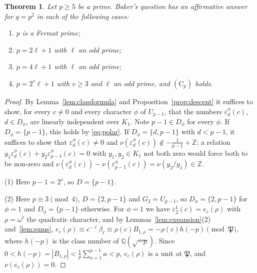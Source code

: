\documentclass[11pt]{amsart}
\newtheorem{theorem}{Theorem}[section]
\theoremstyle{definition}
\theoremstyle{remark}
\providecommand{\Q}{\mathbb Q}
\providecommand{\Z}{\mathbb Z}
\newcommand{\fP}{\mathfrak P}
\numberwithin{equation}{section}
\begin{document}
\begin{theorem}\label{thm:psquare}
Let $p\ge5$ be a prime.
Baker's question has an affirmative answer for $q=p^2$ in each of the following cases:
\begin{enumerate}
\item $p$ is a Fermat prime;
\item $p=2\ell+1$ with $\ell$ an odd prime;
\item $p=4\ell+1$ with $\ell$ an odd prime;
\item $p=2^v\ell+1$ with $v\ge3$ and $\ell$ an odd prime, and $(\mathrm C_p)$ holds.
\end{enumerate}
\end{theorem}

\begin{proof}
By Lemma~\ref{lem:classformula} and Proposition~\ref{prop:descent} it suffices to show, for every $c\ne0$ and every character $\phi$ of $U_{p-1}$, that the numbers $\varepsilon_d^\phi(c)$, $d\in D_\phi$, are linearly independent over $K_1$.
Note $p-1\in D_\phi$ for every $\phi$.
If $D_\phi=\{p-1\}$, this holds by \eqref{eq:polar}.
If $D_\phi=\{d,p-1\}$ with $d<p-1$, it suffices to show that $\varepsilon_d^\phi(c)\ne0$ and $\nu(\varepsilon_d^\phi(c))\notin-\frac1{p-1}+\Z$: a relation $y_1\varepsilon_d^\phi(c)+y_2\varepsilon_{p-1}^\phi(c)=0$ with $y_1,y_2\in K_1$ not both zero would force both to be non-zero and $\nu(\varepsilon^\phi_d(c))-\nu(\varepsilon^\phi_{p-1}(c))=\nu(y_2/y_1)\in\Z$.

(1) Here $p-1=2^v$, so $D=\{p-1\}$.

(2) Here $p\equiv3\pmod 4$, $D=\{2,p-1\}$ and $G_2=U_{p-1}$, so $D_\phi=\{2,p-1\}$ for $\phi=1$ and $D_\phi=\{p-1\}$ otherwise.
For $\phi=1$ we have $\varepsilon_2^1(c)=e_c(\rho)$ with $\rho=\omega^{\ell}$ the quadratic character, and by Lemmas~\ref{lem:expansion}(2) and~\ref{lem:sums}, $e_c(\rho)\equiv c^{-\ell}\beta_\ell\equiv\rho(c)B_{1,\rho}=-\rho(c)h(-p)\pmod\fP$, where $h(-p)$ is the class number of $\Q(\sqrt{-p})$.
Since $0<h(-p)=|B_{1,\rho}|<\frac1p\sum_{a=1}^{p-1}a<p$, $e_c(\rho)$ is a unit at $\fP$, and $\nu(e_c(\rho))=0$.


\end{proof}
\end{document}
